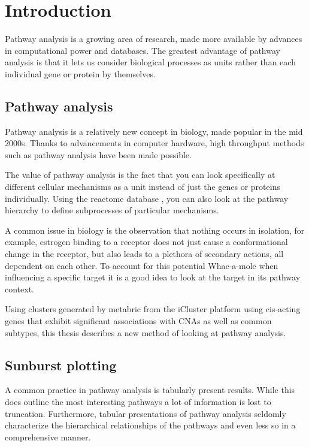\documentclass[11pt]{article}
\begin{document}
\maketitle


\begin{abstract}

\end{abstract}

\section*{Introduction}
  Pathway analysis is a growing area of research, made more available by advances in computational power and databases. The greatest advantage of pathway analysis is that it lets us consider biological processes as units rather than each individual gene or protein by themselves.

\subsection{Pathway analysis}
  Pathway analysis is a relatively new concept in biology, made popular in the mid 2000s. Thanks to advancements in computer hardware, high throughput methods such as pathway analysis have been made possible.

  The value of pathway analysis is the fact that you can look specifically at different cellular mechanisms as a unit instead of just the genes or proteins individually. Using the reactome database \cite{reactome}, you can also look at the pathway hierarchy to define subprocesses of particular mechanisms.

  A common issue in biology is the observation that nothing occurs in isolation, for example, estrogen binding to a receptor does not just cause a conformational change in the receptor, but also leads to a plethora of secondary actions, all dependent on each other. To account for this potential Whac-a-mole when influencing a specific target it is a good idea to look at the target in its pathway context.

  Using clusters generated by metabric from the iCluster platform using cis-acting genes that exhibit significant associations with CNAs \cite{metabric} as well as common subtypes, this thesis describes a new method of looking at pathway analysis.

\subsection{Sunburst plotting}
  A common practice in pathway analysis is tabularly present results. While this does outline the most interesting pathways a lot of information is lost to truncation. Furthermore, tabular presentations of pathway analysis seldomly characterize the hierarchical relationships of the pathways and even less so in a comprehensive manner.
\end{document}
